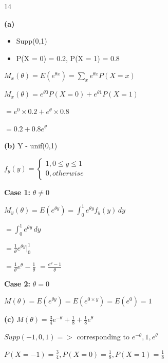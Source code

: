 \documentclass[12 pt]{article}
\begin{document}
    \begin{exercise}{14}
    \hfill

    \textbf{(a)} \begin{itemize}
        \item Supp(0,1)
        \item P(X = 0) = 0.2, P(X = 1) = 0.8
    \end{itemize}

    $M_x(\theta) = E(e^{\theta x}) = \sum_{x} e^{\theta x} P(X=x)$

    $M_x(\theta) = e^{\theta 0} P(X = 0) + e^{\theta 1} P(X = 1)$

    $= e^0 \times 0.2 + e^{\theta} \times 0.8$

    $= 0.2 + 0.8 e^{\theta}$

    \hfill

    \textbf{(b)} Y - unif(0,1)

    $f_y(y) = \begin{cases}
        1, 0 \leq y \leq 1 \\
        0, otherwise
    \end{cases}$

    \textbf{Case 1:} $\theta \neq 0$

    $M_y(\theta) = E(e^{\theta y}) = \int_{0}^1 e^{\theta y} f_y(y) \, dy$

    $ = \int_{0}^{1} e^{\theta y} \, dy$

    $ = \frac{1}{\theta} e^{\theta y} |_{0}^{1}$

    $= \frac{1}{\theta} e^{\theta} - \frac{1}{\theta}$
    $= \frac{e^{\theta} - 1}{\theta}$

    \hfill

    \textbf{Case 2:} $\theta = 0$

    $M(\theta) = E(e^{\theta y}) = E(e^{0 \times y}) = E(e^0) = 1$

    \hfill

    \textbf{(c)} $M(\theta) = \frac{3}{4} e^{-\theta} + \frac{1}{8} + \frac{1}{8} e^{\theta}$

    $Supp(-1, 0, 1) =>$ corresponding to $e^{-\theta}, 1, e^{\theta}$

    $P(X = -1) = \frac{3}{4}, P(X=0) = \frac{1}{8}, P(X=1) = \frac{1}{8}$

    \hfill     
    \end{exercise}
\end{document}

